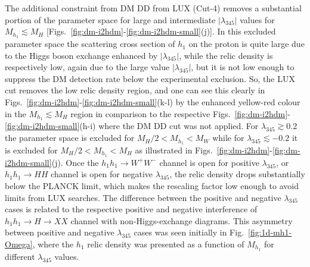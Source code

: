 The additional constraint from DM DD from LUX (Cut-4)
removes a substantial portion of the  parameter space for large and intermediate $|\lambda_{345}|$
values for $M_{h_1}\lesssim M_H$  [Figs.~\ref{fig:dm-i2hdm}-\ref{fig:dm-i2hdm-small}(j)].
In this excluded parameter space the scattering cross section of $h_1$ on the proton 
is quite large due to the Higgs boson exchange enhanced by $|\lambda_{345}|$, while the relic density is respectively low,
again due to the large value  $|\lambda_{345}|$, but it is not low enough to suppress
the DM detection rate below the experimental exclusion.
So, the LUX cut removes the low relic density region, 
and one can see this clearly in Figs.~\ref{fig:dm-i2hdm}-\ref{fig:dm-i2hdm-small}(k-l)
by the enhanced yellow-red colour in the $M_{h_1}\lesssim M_H$ region 
in comparison to the respective Figs.~\ref{fig:dm-i2hdm}-\ref{fig:dm-i2hdm-small}(h-i)
where the DM DD cut was not applied.
For $\lambda_{345} \gtrsim 0.2$ the parameter space is excluded
for $M_H/2<M_{h_1}<M_W$ while for  $\lambda_{345} \lesssim -0.2$
it is excluded for $M_H/2<M_{h_1}<M_H$ as illustrated in Figs.~\ref{fig:dm-i2hdm}-\ref{fig:dm-i2hdm-small}(j).
Once the $h_1 h_1 \to W^+ W^-$ channel is open for positive  $\lambda_{345}$,
or $h_1 h_1 \to H H$ channel is open for negative $\lambda_{345}$,
the relic density drops substantially below the PLANCK limit, which makes the rescaling factor 
low enough to avoid limits from LUX searches.
The difference between the positive and negative $\lambda_{345}$ cases
is related to the respective positive and negative interference of
$h_1 h_1 \to H \to X X$ channel with non-Higgs-exchange diagrams.
This asymmetry between positive and negative $\lambda_{345}$ cases was seen initially
in Fig.~\ref{fig:1d-mh1-Omega}, where the $h_1$ relic density was presented as a function 
of $M_{h_1}$ for different $\lambda_{345}$ values.

